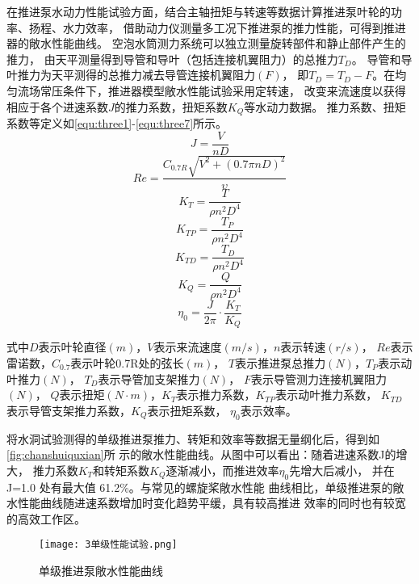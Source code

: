 在推进泵水动力性能试验方面，结合主轴扭矩与转速等数据计算推进泵叶轮的功率、扬程、水力效率，
借助动力仪测量多工况下推进泵的推力性能，可得到推进器的敞水性能曲线。
空泡水筒测力系统可以独立测量旋转部件和静止部件产生的推力，
由天平测量得到导管和导叶（包括连接机翼阻力）的总推力$T_{D}$。
导管和导叶推力为天平测得的总推力减去导管连接机翼阻力$(F)$，
即$T_{D}=T_{D}-F$。在均匀流场常压条件下，推进器模型敞水性能试验采用定转速，
改变来流速度以获得相应于各个进速系数$J$的推力系数，扭矩系数$K_{Q}$等水动力数据。
推力系数、扭矩系数等定义如\autoref{equ:three1}-\autoref{equ:three7}所示。
\begin{equation}
    \label{equ:three1}
    J=\frac{V}{nD} 
\end{equation}
\begin{equation}
    \label{equ:three2}
    Re =\frac{C_{0.7R}\sqrt{V^{2}+\left ( 0.7\pi nD \right )^{2}   }  }{\upsilon } 
\end{equation}
\begin{equation}
    \label{equ:three3}
    K_{T}=\frac{T}{\rho n^{2}D^{4}  }  
\end{equation}
\begin{equation}
    \label{equ:three4}
    K_{TP}=\frac{T_{P} }{\rho n^{2}D^{4}  }  
\end{equation}
\begin{equation}
    \label{equ:three5}
    K_{TD}=\frac{T_{D} }{\rho n^{2}D^{4}  }  
\end{equation}
\begin{equation}
    \label{equ:three6}
    K_{Q}=\frac{Q}{\rho n^{2}D^{4}  }  
\end{equation}
\begin{equation}
    \label{equ:three7}
    \eta _{0} =\frac{J}{2\pi } \cdot \frac{K_{T} }{K_{Q}} 
\end{equation}

式中$D$表示叶轮直径$(m)$，$V$表示来流速度$(m/s)$，$n$表示转速$(r/s)$，
$Re$表示雷诺数，$C_{0.7}$表示叶轮0.7R处的弦长$(m)$，
$T$表示推进泵总推力$(N)$，$T_{P}$表示动叶推力$(N)$，
$T_{D} $表示导管加支架推力$(N)$，
$F$表示导管测力连接机翼阻力$(N)$，
$Q$表示扭矩$(N \cdot m)$，$K_{T}$表示推力系数，$K_{TP}$表示动叶推力系数，
$K_{TD}$表示导管支架推力系数，$K_{Q}$表示扭矩系数，
$\eta _{0}$表示效率。

将水洞试验测得的单级推进泵推力、转矩和效率等数据无量纲化后，得到如\autoref{fig:chanshuiquxian}所
示的敞水性能曲线。从图中可以看出：随着进速系数J的增大，
推力系数$K_T$和转矩系数$K_Q$逐渐减小，而推进效率$\eta_0$先增大后减小，
并在 J=1.0 处有最大值 61.2\%。与常见的螺旋桨敞水性能
曲线相比，单级推进泵的敞水性能曲线随进速系数增加时变化趋势平缓，具有较高推进
效率的同时也有较宽的高效工作区。
\begin{figure}[htbp]
    \centering
    \texttt{[image: 3单级性能试验.png]}
    \caption{\label{fig:chanshuiquxian}单级推进泵敞水性能曲线}
\end{figure}

